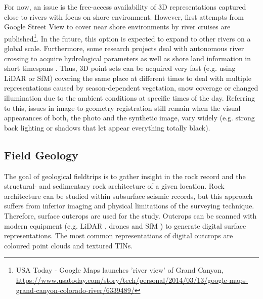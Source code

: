 \documentclass[review]{elsarticle}
\begin{document}
For now, an issue is the free-access availability of 3D representations captured close to rivers with focus on shore environment. However, first attempts from Google Street View to cover near shore environments by river cruises are published\footnote{USA Today - Google Maps launches 'river view' of Grand Canyon, \url{https://www.usatoday.com/story/tech/personal/2014/03/13/google-maps-grand-canyon-colorado-river/6339489/}}. In the future, this option is expected to expand to other rivers on a global scale. Furthermore, some research projects deal with autonomous river crossing to acquire hydrological parameters as well as shore land information in short timespans \cite{Sardemann2018}. Thus, 3D point sets can be acquired very fast (e.g. using \gls{LiDAR} or \gls{SfM}) covering the same place at different times to deal with multiple representations caused by season-dependent vegetation, snow coverage or changed illumination due to the ambient conditions at specific times of the day. Referring to this, issues in image-to-geometry registration still remain when the visual appearances of both, the photo and the synthetic image, vary widely (e.g. strong back lighting or shadows that let appear everything totally black). 







\subsection{Field Geology}
\label{sec:applications:field_geology}

The goal of geological fieldtrips is to gather insight in the rock record and the structural- and sedimentary rock architecture of a given location. Rock architecture can be studied within subsurface seismic records, but this approach suffers from inferior imaging  and physical limitations of the surveying technique. Therefore, surface outcrops are used for the study. Outcrops can be scanned with modern equipment (e.g. \gls{LiDAR} \cite{Buckley2008a,Buckley2010}, drones \cite{Dewez2015} and \gls{SfM} \cite{Chandler2016}) to generate digital surface representations. The most common representations of digital outcrops are coloured point clouds and textured \glspl{TIN}.
\end{document}

